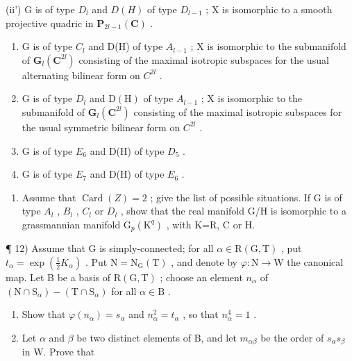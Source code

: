(ii') G is of type \(D_{l}\) and \(D(H)\) of type \(D_{l-1}\) ; X is isomorphic to a smooth projective quadric in \(\mathbf{P}_{2l-1}(\mathbf{C})\) .

\begin{enumerate}
\def\labelenumi{(\roman{enumi})}
\setcounter{enumi}{2}
\item
  G is of type \(C_{l}\) and D(H) of type \(A_{l-1}\) ; X is isomorphic to the submanifold of \(\mathbf{G}_{l}(\mathbf{C}^{2l})\) consisting of the maximal isotropic subspaces for the usual alternating bilinear form on \(C^{2l}\) .
\item
  G is of type \(D_{l}\) and \(\mathrm{D}(\mathrm{H})\) of type \(A_{l-1}\) ; X is isomorphic to the submanifold of \(\mathbf{G}_{l}(\mathbf{C}^{2l})\) consisting of the maximal isotropic subspaces for the usual symmetric bilinear form on \(C^{2l}\) .
\item
  G is of type \(E_{6}\) and D(H) of type \(D_{5}\) .
\item
  G is of type \(E_{7}\) and D(H) of type \(E_{6}\) .
\end{enumerate}

\begin{enumerate}
\def\labelenumi{\alph{enumi})}
\setcounter{enumi}{2}
\tightlist
\item
  Assume that \(\operatorname{Card}(Z)=2\) ; give the list of possible situations. If G is of type \(A_{l}\) , \(B_{l}\) , \(C_{l}\) or \(D_{l}\) , show that the real manifold G/H is isomorphic to a grassmannian manifold \(\mathrm{G}_{p}(\mathrm{K}^{q})\) , with K=R, C or H.
\end{enumerate}

¶ 12) Assume that G is simply-connected; for all \(\alpha \in \mathrm{R}(\mathrm{G},\mathrm{T})\) , put \(t_{\alpha} = \exp (\frac{1}{2} K_{\alpha})\) . Put \(\mathrm{N} = \mathrm{N}_{\mathrm{G}}(\mathrm{T})\) , and denote by \(\varphi : \mathrm{N} \to \mathrm{W}\) the canonical map. Let B be a basis of \(\mathrm{R}(\mathrm{G},\mathrm{T})\) ; choose an element \(n_{\alpha}\) of \((\mathrm{N} \cap \mathrm{S}_{\alpha}) - (\mathrm{T} \cap \mathrm{S}_{\alpha})\) for all \(\alpha \in \mathrm{B}\) .

\begin{enumerate}
\def\labelenumi{\alph{enumi})}
\item
  Show that \(\varphi(n_{\alpha}) = s_{\alpha}\) and \(n_{\alpha}^{2} = t_{\alpha}\) , so that \(n_{\alpha}^{4} = 1\) .
\item
  Let \(\alpha\) and \(\beta\) be two distinct elements of B, and let \(m_{\alpha \beta}\) be the order of \(s_{\alpha}s_{\beta}\) in W. Prove that
\end{enumerate}

